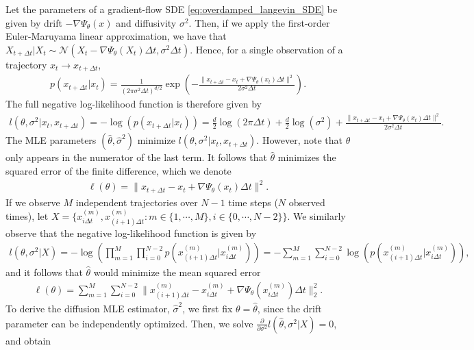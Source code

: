 \documentclass[twoside]{article}
\begin{document}
Let the parameters of a gradient-flow SDE \eqref{eq:overdamped_langevin_SDE} be given by drift $-\nabla \Psi_\theta(x)$ and diffusivity $\sigma^2$. Then, if we apply the first-order Euler-Maruyama linear approximation, we have that $X_{t+\Delta t} | X_t \sim \mathcal{N}(X_t - \nabla \Psi_\theta(X_t)\Delta t, \sigma^2 \Delta t)$. Hence, for a single observation of a trajectory $x_t \to x_{t+\Delta t}$,
\begin{align*}
    p(x_{t+\Delta t}|x_t) = \frac{1}{(2\pi \sigma^2\Delta t)^{d/2}}\exp\left(-\frac{\|x_{t+\Delta t} - x_t + \nabla \Psi_\theta(x_t)\Delta t\|^2}{2\sigma^2\Delta t}\right).
\end{align*}
The full negative log-likelihood function is therefore given by
\begin{align}
    l(\theta, \sigma^2 | x_t, x_{t+\Delta t}) = -\log\left(p(x_{t+\Delta t}|x_t)\right) = \frac{d}{2}\log(2\pi\Delta t) + \frac{d}{2}\log(\sigma^2) + \frac{\|x_{t+\Delta t} - x_t + \nabla \Psi_\theta(x_t)\Delta t\|^2}{2\sigma^2\Delta t}.
\end{align}
The MLE parameters $(\hat{\theta}, \hat{\sigma}^2)$ minimize $l(\theta, \sigma^2 | x_t, x_{t+\Delta t})$. However, note that $\theta$ only appears in the numerator of the last term. It follows that $\hat{\theta}$ minimizes the squared error of the finite difference, which we denote
\begin{align}
    \ell(\theta) = \|x_{t+\Delta t} - x_t + \nabla \Psi_\theta(x_t)\Delta t\|^2.
\end{align}
If we observe $M$ independent trajectories over $N-1$ time steps ($N$ observed times), let $X= \bigl\{x_{i\Delta t}^{(m)}, x_{(i+1)\Delta t}^{(m)}: m \in \{1, \cdots, M \},i \in \{0, \cdots, N-2\}\bigr\}$. We similarly observe that the negative log-likelihood function is given by 
\begin{align*}
     l\left(\theta, \sigma^2 | X \right) = -\log\left(\prod_{m=1}^{M}\prod_{i=0}^{N-2} p(x_{(i+1)\Delta t}^{(m)}|x_{i\Delta t}^{(m)})\right) = -\sum_{m=1}^M\sum_{i=0}^{N-2}\log(p(x_{(i+1)\Delta t}^{(m)}|x_{i\Delta t}^{(m)})),
\end{align*}
and it follows that $\hat{\theta}$ would minimize the mean squared error
\begin{align}
    \ell(\theta)=\sum_{m=1}^{M}\sum_{i=0}^{N-2}\Big\|x_{(i+1)\Delta t}^{(m)}-x_{i\Delta t}^{(m)}+\nabla \Psi_\theta(x_{i\Delta t}^{(m)})\Delta t\Big\|_2^2.
\end{align}
To derive the diffusion MLE estimator, $\hat{\sigma}^2$, we first fix $\theta = \hat{\theta}$, since the drift parameter can be independently optimized. Then, we solve $\frac{\partial}{\partial \sigma^2}l\left(\hat{\theta}, \sigma^2 | X\right) =0$, and obtain
\end{document}
